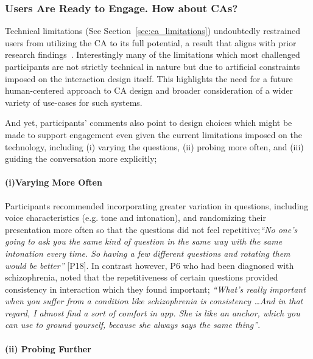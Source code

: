         \subsubsection{Users Are Ready to Engage. How about \acp{CA}?} %
        
            Technical limitations (See Section~\ref{sec:ca_limitations}) undoubtedly restrained users from utilizing the \ac{CA} to its full potential, a result that aligns with prior research findings~\cite{Rafal2018Workplace}. Interestingly many of the limitations which most challenged participants are not strictly technical in nature but due to artificial constraints imposed on the interaction design itself. This highlights the need for a future human-centered approach to \ac{CA} design and broader consideration of a wider variety of use-cases for such systems. 
            
            And yet, participants' comments also point to design choices which might be made to support engagement even given the current limitations imposed on the technology, including (i) varying the questions, (ii) probing more often, and (iii) guiding the conversation more explicitly; %
            
            \paragraph{(i)Varying More Often}
            
                Participants recommended incorporating greater variation in questions, including voice characteristics (e.g. tone and intonation), and randomizing their presentation more often so that the questions did not feel repetitive;\textit{``No one's going to ask you the same kind of question in the same way with the same intonation every time. So having a few different questions and rotating them would be better''} [P18]. In contrast however, P6 who had been diagnosed with schizophrenia, noted that the repetitiveness of certain questions provided consistency in interaction which they found important; \textit{``What's really important when you suffer from a condition like schizophrenia is consistency \ldots And in that regard, I almost find a sort of comfort in \acl{app}. She is like an anchor, which you can use to ground yourself, because she always says the same thing''}.
            
            \paragraph{(ii) Probing Further}
            
